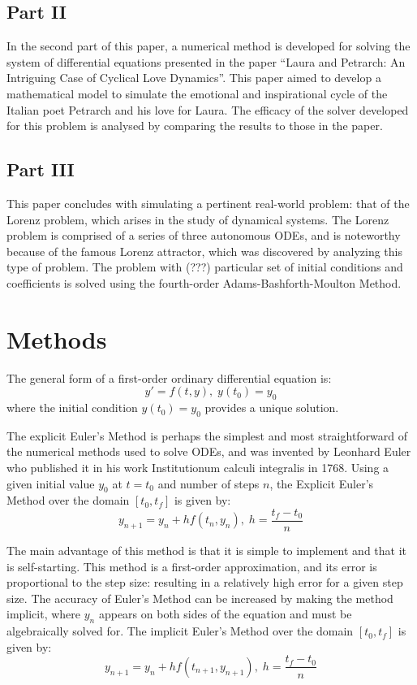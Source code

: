 \documentclass[11pt]{article}
\begin{document}
\subsection{Part II}\label{S:2.2}
%
In the second part of this paper, a numerical method is developed for solving the
system of differential equations presented in the paper “Laura and Petrarch: An 
Intriguing Case of Cyclical Love Dynamics”. This paper aimed to develop a mathematical
model to simulate the emotional and inspirational cycle of the Italian poet Petrarch
and his love for Laura. The efficacy of the solver developed for this problem is
analysed by comparing the results to those in the paper.
\subsection{Part III}\label{S:2.3}
%
This paper concludes with simulating a pertinent real-world problem: that of the 
Lorenz problem, which arises in the study of dynamical systems. The Lorenz problem
is comprised of a series of three autonomous ODEs, and is noteworthy because of
the famous Lorenz attractor, which was discovered by analyzing this type of 
problem. The problem with (???) particular set of initial conditions and coefficients
is solved using the fourth-order Adams-Bashforth-Moulton Method.
\section{Methods}\label{S:3}

The general form of a first-order ordinary differential equation is:
$$y'=f(t,y),\; y(t_0)=y_0$$
where the initial condition $y(t_0)=y_0$ provides a unique solution.

The explicit Euler's Method is perhaps the simplest and most straightforward of
the numerical methods used to solve ODEs, and was invented by Leonhard Euler who 
published it in his work Institutionum calculi integralis in 1768. Using a given
initial value $y_0$ at $t=t_0$ and number of steps $n$, the Explicit Euler's Method over
the domain $[t_0, t_f]$ is given by:
$$y_{n+1} = y_{n}+hf(t_{n}, y_{n}),\; h=\frac{t_f-t_0}{n}$$

The main advantage of this method is that it is simple to implement and that it
is self-starting. This method is a first-order approximation, and its error is
proportional to the step size: resulting in a relatively high error for a given
step size. The accuracy of Euler's Method can be increased by making the method 
implicit, where $y_n$ appears on both sides of the equation and must be algebraically
solved for. The implicit Euler's Method over the domain $[t_0, t_f]$ is given by:
$$y_{n+1} = y_{n}+hf(t_{n+1}, y_{n+1}),\; h=\frac{t_f-t_0}{n}$$
\end{document}
